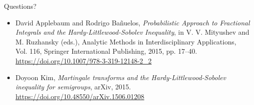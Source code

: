 \documentclass{if-beamer}
\begin{document}
\begin{frame}
    \begin{center}
        \Huge Questions?
    \end{center}
\vfill
    
\begin{itemize}
    \item
    David Applebaum and Rodrigo Bañuelos, \emph{Probabilistic Approach to Fractional Integrals and the Hardy-Littlewood-Sobolev Inequality}, in V. V. Mityushev and M. Ruzhansky (eds.), {Analytic Methods in Interdisciplinary Applications}, Vol. 116, Springer International Publishing, 2015, pp. 17--40. \url{https://doi.org/10.1007/978-3-319-12148-2_2}

    \item
    Doyoon Kim, \emph{Martingale transforms and the Hardy-Littlewood-Sobolev inequality for semigroups}, arXiv, 2015. \url{https://doi.org/10.48550/arXiv.1506.01208}

    \end{itemize}
\end{frame}
\end{document}
